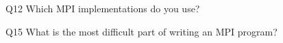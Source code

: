 \begin{description}%
\item{Q12} Which MPI implementations do you use?%
\item{Q15} What is the most difficult part of writing an MPI program?%
\end{description}%
